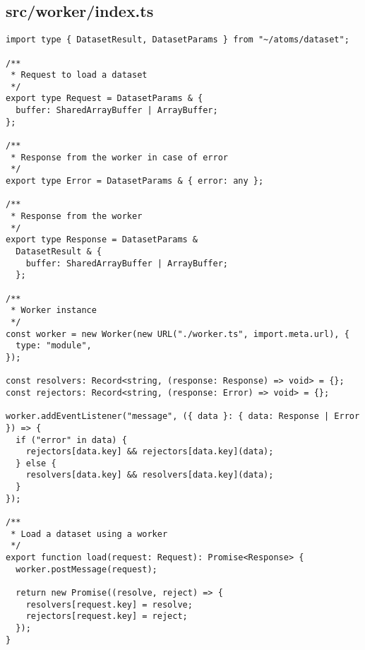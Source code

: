 \subsection{src/worker/index.ts}
\begin{verbatim}
import type { DatasetResult, DatasetParams } from "~/atoms/dataset";

/**
 * Request to load a dataset
 */
export type Request = DatasetParams & {
  buffer: SharedArrayBuffer | ArrayBuffer;
};

/**
 * Response from the worker in case of error
 */
export type Error = DatasetParams & { error: any };

/**
 * Response from the worker
 */
export type Response = DatasetParams &
  DatasetResult & {
    buffer: SharedArrayBuffer | ArrayBuffer;
  };

/**
 * Worker instance
 */
const worker = new Worker(new URL("./worker.ts", import.meta.url), {
  type: "module",
});

const resolvers: Record<string, (response: Response) => void> = {};
const rejectors: Record<string, (response: Error) => void> = {};

worker.addEventListener("message", ({ data }: { data: Response | Error }) => {
  if ("error" in data) {
    rejectors[data.key] && rejectors[data.key](data);
  } else {
    resolvers[data.key] && resolvers[data.key](data);
  }
});

/**
 * Load a dataset using a worker
 */
export function load(request: Request): Promise<Response> {
  worker.postMessage(request);

  return new Promise((resolve, reject) => {
    resolvers[request.key] = resolve;
    rejectors[request.key] = reject;
  });
}

\end{verbatim}
